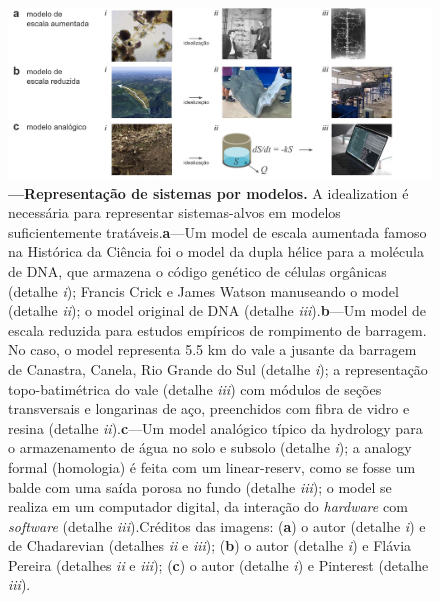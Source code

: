 \documentclass[./main.tex]{subfiles}
\begin{document}
\begin{figure}[t!] %
	\centering				
	\includegraphics[width=0.95\linewidth]{figs/fig_representation.jpg}		
	\caption[Representação de sistemas por modelos]
	{\textbf{---\;Representação de sistemas por modelos.}
        A \gls{idealization} é necessária para representar sistemas-alvos em modelos suficientemente tratáveis.\;\textbf{a}\;---\;Um \gls{model} de escala aumentada famoso na Histórica da Ciência foi o \gls{model} da dupla hélice para a molécula de DNA, que armazena o código genético de células orgânicas (detalhe \textrm{\textit{i}}); Francis Crick e James Watson manuseando o \gls{model} (detalhe \textrm{\textit{ii}}); o \gls{model} original de DNA (detalhe \textrm{\textit{iii}}).\;\textbf{b}\;---\;Um \gls{model} de escala reduzida para estudos empíricos de rompimento de barragem. No caso, o \gls{model} representa 5.5 km do vale a jusante da barragem de Canastra, Canela, Rio Grande do Sul (detalhe \textrm{\textit{i}}); a representação topo-batimétrica do vale (detalhe \textrm{\textit{iii}}) com módulos de seções transversais e longarinas de aço, preenchidos com fibra de vidro e resina (detalhe \textrm{\textit{ii}}).\;\textbf{c}\;---\;Um \gls{model} analógico típico da \gls{hydrology} para o armazenamento de água no solo e subsolo (detalhe \textrm{\textit{i}}); a \gls{analogy} formal (homologia) é feita com um \gls{linear-reserv}, como se fosse um balde com uma saída porosa no fundo (detalhe \textrm{\textit{iii}}); o \gls{model} se realiza em um computador digital, da interação do \textit{hardware} com \textit{software} (detalhe \textrm{\textit{iii}}).\;Créditos das imagens: (\textbf{a}) o autor (detalhe \textrm{\textit{i}}) e de Chadarevian \cite{deChadarevian2003} (detalhes \textrm{\textit{ii}} e \textrm{\textit{iii}}); (\textbf{b}) o autor (detalhe \textrm{\textit{i}}) e Flávia Pereira \cite{Pereira2023} (detalhes \textrm{\textit{ii}} e \textrm{\textit{iii}}); (\textbf{c}) o autor (detalhe \textrm{\textit{i}}) e Pinterest (detalhe \textrm{\textit{iii}}).
	}
\label{fig:sys:represen}  %
\end{figure}
\end{document}
